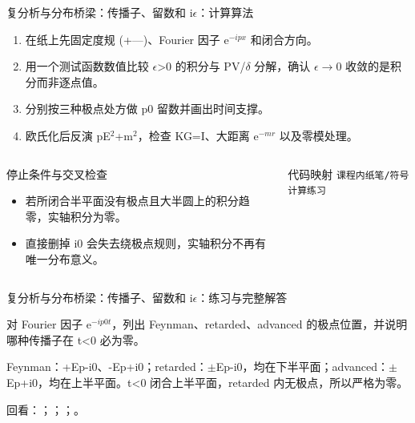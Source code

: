 \begin{frame}[t]{复分析与分布桥梁：传播子、留数和 i\ensuremath{\epsilon}：计算算法}
\footnotesize
{}\begin{enumerate}
\item 在纸上先固定度规 (+---)、Fourier 因子 e\ensuremath{^{-ipx}} 和闭合方向。
\item 用一个测试函数数值比较 \ensuremath{\epsilon}>0 的积分与 PV/\allowbreak{}\ensuremath{\delta} 分解，确认 \ensuremath{\epsilon}\ensuremath{\rightarrow}0 收敛的是积分而非逐点值。
\item 分别按三种极点处方做 p0 留数并画出时间支撑。
\item 欧氏化后反演 pE\ensuremath{^{2}}+m\ensuremath{^{2}}，检查 KG=I、大距离 e\ensuremath{^{-mr}} 以及零模处理。
\end{enumerate}\begin{columns}[T,onlytextwidth]
\begin{block}{停止条件与交叉检查}\scriptsize\begin{itemize}
\item[\CheckMark] 若所闭合半平面没有极点且大半圆上的积分趋零，实轴积分为零。
\item[\CheckMark] 直接删掉 i0 会失去绕极点规则，实轴积分不再有唯一分布意义。
\end{itemize}\end{block}
\begin{block}{代码映射}
\scriptsize \texttt{课程内纸笔/\allowbreak{}符号计算练习}
\end{block}\end{columns}\end{frame}

\begin{frame}[t]{复分析与分布桥梁：传播子、留数和 i\ensuremath{\epsilon}：练习与完整解答}
\footnotesize
\begin{block}{}对 Fourier 因子 e\ensuremath{^{-ip0t}}，列出 Feynman、retarded、advanced 的极点位置，并说明哪种传播子在 t<0 必为零。\end{block}
\begin{exampleblock}{}Feynman：+Ep-i0、-Ep+i0；retarded：\ensuremath{\pm}Ep-i0，均在下半平面；advanced：\ensuremath{\pm}Ep+i0，均在上半平面。t<0 闭合上半平面，retarded 内无极点，所以严格为零。\end{exampleblock}
\vfill
\scriptsize 回看：；；；。
\end{frame}

